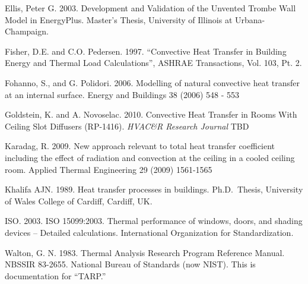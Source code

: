 Ellis, Peter G. 2003. Development and Validation of the Unvented Trombe Wall Model in EnergyPlus. Master's Thesis, University of Illinois at Urbana-Champaign.

Fisher, D.E. and C.O. Pedersen. 1997. ``Convective Heat Transfer in Building Energy and Thermal Load Calculations'', ASHRAE Transactions, Vol. 103, Pt. 2.

Fohanno, S., and G. Polidori. 2006. Modelling of natural convective heat transfer at an internal surface. Energy and Buildings 38 (2006) 548 - 553

Goldstein, K. and A. Novoselac. 2010. Convective Heat Transfer in Rooms With Ceiling Slot Diffusers (RP-1416). \emph{HVAC\&R Research Journal} TBD

Karadag, R. 2009. New approach relevant to total heat transfer coefficient including the effect of radiation and convection at the ceiling in a cooled ceiling room. Applied Thermal Engineering 29 (2009) 1561-1565

Khalifa AJN. 1989. Heat transfer processes in buildings. Ph.D.~Thesis, University of Wales College of Cardiff, Cardiff, UK.

ISO. 2003. ISO 15099:2003. Thermal performance of windows, doors, and shading devices -- Detailed calculations. International Organization for Standardization.

Walton, G. N. 1983. Thermal Analysis Research Program Reference Manual. NBSSIR 83-2655. National Bureau of Standards (now NIST). This is documentation for ``TARP.''
